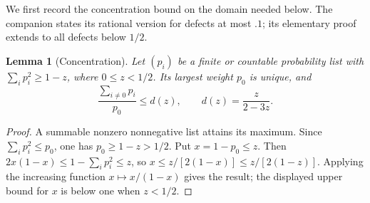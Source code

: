 \documentclass[11pt,a4paper]{article}
\newtheorem{lemma}{Lemma}
\begin{document}
We first record the concentration bound on the domain needed below.
The companion states its rational version for defects at most $.1$;
its elementary proof extends to all defects below $1/2$.
\begin{lemma}[Concentration]\label{lem:concentration}
Let $(p_i)$ be a finite or countable probability list with
$\sum_i p_i^2\ge1-z$, where $0\le z<1/2$.
Its largest weight $p_0$ is unique, and
\[
 \frac{\sum_{i\ne0}p_i}{p_0}\le d(z),\qquad
 d(z)=\frac{z}{2-3z}.
\]
\end{lemma}
\begin{proof}
A summable nonzero nonnegative list attains its maximum.
Since $\sum_i p_i^2\le p_0$, one has $p_0\ge1-z>1/2$.
Put $x=1-p_0\le z$. Then
$2x(1-x)\le1-\sum_i p_i^2\le z$, so
$x\le z/[2(1-x)]\le z/[2(1-z)]$.
Applying the increasing function $x\mapsto x/(1-x)$ gives the result;
the displayed upper bound for $x$ is below one when $z<1/2$.
\end{proof}
\end{document}
